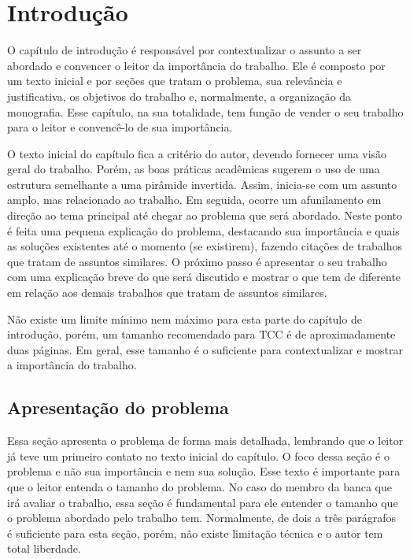 \chapter{Introdução}

O capítulo de introdução é responsável por contextualizar o assunto a ser abordado e convencer o leitor da importância do trabalho.
Ele é composto por um texto inicial e por seções que tratam o problema, sua relevância e justificativa, os objetivos do trabalho e, normalmente, a organização da monografia.
Esse capítulo, na sua totalidade, tem função de vender o seu trabalho para o leitor e convencê-lo de sua importância.

O texto inicial do capítulo fica a critério do autor, devendo fornecer uma visão geral do trabalho.
Porém, as boas práticas acadêmicas sugerem o uso de uma estrutura semelhante a uma pirâmide invertida.
Assim, inicia-se com um assunto amplo, mas relacionado ao trabalho.
Em seguida, ocorre um afunilamento em direção ao tema principal até chegar ao problema que será abordado.
Neste ponto é feita uma pequena explicação do problema, destacando sua importância e quais as soluções existentes até o momento (se existirem), fazendo citações de trabalhos que tratam de assuntos similares.
O próximo passo é apresentar o seu trabalho com uma explicação breve do que será discutido e mostrar o que tem de diferente em relação aos demais trabalhos que tratam de assuntos similares.

Não existe um limite mínimo nem máximo para esta parte do capítulo de introdução, porém, um tamanho recomendado para TCC é de aproximadamente duas páginas.
Em geral, esse tamanho é o suficiente para contextualizar e mostrar a importância do trabalho. 

\section{Apresentação do problema}

Essa seção apresenta o problema de forma mais detalhada, lembrando que o leitor já teve um primeiro contato no texto inicial do capítulo.
O foco dessa seção é o problema e não sua importância e nem sua solução.
Esse texto é importante para que o leitor entenda o tamanho do problema.
No caso do membro da banca que irá avaliar o trabalho, essa seção é fundamental para ele entender o tamanho que o problema abordado pelo trabalho tem.
Normalmente, de dois a três parágrafos é suficiente para esta seção, porém, não existe limitação técnica e o autor tem total liberdade.


